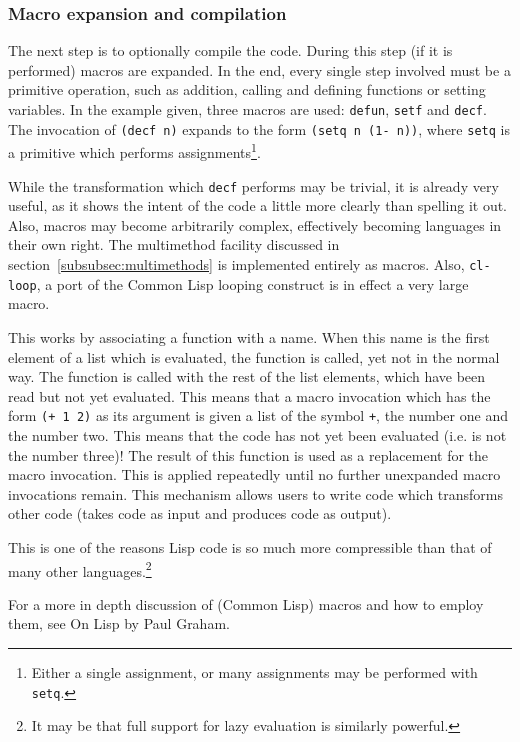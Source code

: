 \documentclass[a4paper,10pt,twoside]{report}
\newcommand{\cl}{Common Lisp}
\newcommand{\sym}[1]{\texttt{#1}}
\newcommand{\fun}[1]{\texttt{#1}}
\begin{document}
\subsubsection{Macro expansion and compilation}
\label{subsubsec:compilation}

The next step is to optionally compile the code.  During this step (if it is
performed) macros are expanded.  In the end, every single step involved must be
a primitive operation, such as addition, calling and defining functions or
setting variables.  In the example given, three macros are used: \fun{defun},
\fun{setf} and \fun{decf}.  The invocation of \fun{(decf n)} expands to the form
\texttt{(setq n (1- n))}, where \fun{setq} is a primitive which performs
assignments\footnote{Either a single assignment, or many assignments may be
  performed with \fun{setq}.}.

While the transformation which \fun{decf} performs may be trivial, it is already
very useful, as it shows the intent of the code a little more clearly than
spelling it out.  Also, macros may become arbitrarily complex, effectively
becoming languages in their own right.  The multimethod facility discussed in
section~\ref{subsubsec:multimethods} is implemented entirely as macros.  Also,
\fun{cl-loop}, a port of the \cl{} looping construct is in effect a very large
macro.

This works by associating a function with a name.  When this name is the first
element of a list which is evaluated, the function is called, yet not in the
normal way.  The function is called with the rest of the list elements, which
have been read but not yet evaluated.  This means that a macro invocation which
has the form \texttt{(+ 1 2)} as its argument is given a list of the symbol
\sym{+}, the number one and the number two.  This means that the code has not
yet been evaluated (i.e. is not the number three)!  The result of this function
is used as a replacement for the macro invocation.  This is applied repeatedly
until no further unexpanded macro invocations remain.  This mechanism allows
users to write code which transforms other code (takes code as input and
produces code as output).

This is one of the reasons Lisp code is so much more compressible than that of
many other languages.\footnote{It may be that full support for lazy evaluation
  is similarly powerful.}

For a more in depth discussion of (\cl{}) macros and how to employ them, see On
Lisp by Paul Graham.\cite{on-lisp}
\end{document}

